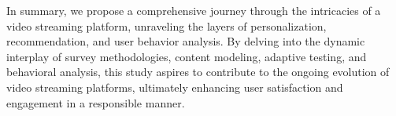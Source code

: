 In summary, we propose a comprehensive journey through the intricacies of a video streaming platform, unraveling the layers of personalization, recommendation, and user behavior analysis. By delving into the dynamic interplay of survey methodologies, content modeling, adaptive testing, and behavioral analysis, this study aspires to contribute to the ongoing evolution of video streaming platforms, ultimately enhancing user satisfaction and engagement in a responsible manner.









